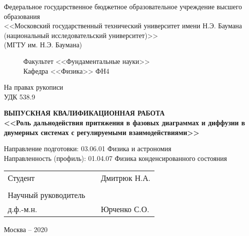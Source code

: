 \begin{titlepage}

\begin{center}
{
\footnotesize{}
Федеральное государственное бюджетное образовательное учреждение высшего образования\\
<<Московский государственный технический университет имени Н.Э. Баумана\\ (национальный исследовательский университет)>>\\(МГТУ им. Н.Э. Баумана)\\
}
\end{center}
\begin{figure}[h!]

\begin{minipage}[b]{0.9\textwidth}\centering
Факультет <<Фундаментальные науки>>\\
Кафедра <<Физика>> ФН4
\\\vspace{1.5cm}
\end{minipage}
\end{figure}
\begin{flushright}
На правах рукописи\\
УДК 538.9
\end{flushright}

\vspace{10mm}

\begin{center}
\textbf{ВЫПУСКНАЯ КВАЛИФИКАЦИОННАЯ РАБОТА}\\\vspace{5mm}
\textbf{<<Роль дальнодействия притяжения в фазовых диаграммах и диффузии в двумерных системах с регулируемыми взаимодействиями>>}
\end{center}


\vspace{5mm}

\begin{flushleft}
Направление подготовки: 03.06.01 Физика и астрономия\\
Направленность (профиль): 01.04.07 Физика конденсированного состояния
\end{flushleft}

\vspace{5mm}

\begin{table}[h]
\begin{tabular}{lll}
Студент\hspace{4cm} & \underline{\hspace{4cm}} & \hspace{2cm}Дмитрюк Н.А.\\\\
Научный руководитель\\д.ф.-м.н. & \underline{\hspace{4cm}} & \hspace{2cm}Юрченко С.О.
\end{tabular}
\end{table}

\vspace{30mm}

\begin{center}
Москва -- 2020
\end{center}
\end{titlepage}